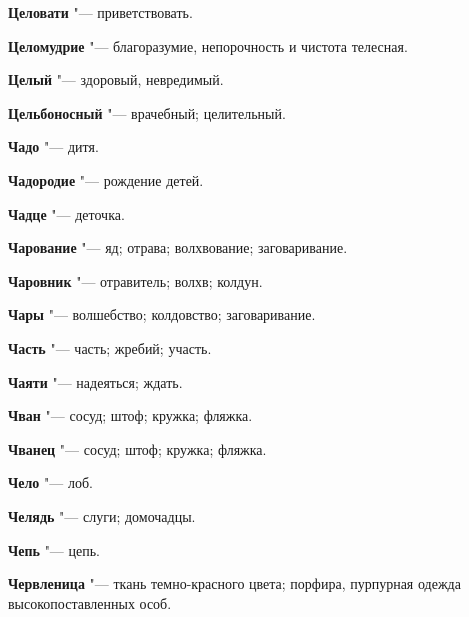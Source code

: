 \begin{mymulticols}{2}
\noindent\textbf{Целовати} "--- приветствовать. 




\noindent\textbf{Целомудрие} "--- благоразумие, непорочность и чистота телесная. 




\noindent\textbf{Целый} "--- здоровый, невредимый. 




\noindent\textbf{Цельбоносный} "--- врачебный; целительный. 









\noindent\textbf{Чадо} "--- дитя. 




\noindent\textbf{Чадородие} "--- рождение детей. 




\noindent\textbf{Чадце} "--- деточка. 




\noindent\textbf{Чарование} "--- яд; отрава; волхвование; заговаривание. 




\noindent\textbf{Чаровник} "--- отравитель; волхв; колдун. 




\noindent\textbf{Чары} "--- волшебство; колдовство; заговаривание. 




\noindent\textbf{Часть} "--- часть; жребий; участь. 




\noindent\textbf{Чаяти} "--- надеяться; ждать. 




\noindent\textbf{Чван} "--- сосуд; штоф; кружка; фляжка. 




\noindent\textbf{Чванец} "--- сосуд; штоф; кружка; фляжка. 




\noindent\textbf{Чело} "--- лоб. 




\noindent\textbf{Челядь} "--- слуги; домочадцы. 




\noindent\textbf{Чепь} "--- цепь. 




\noindent\textbf{Червленица} "--- ткань темно-красного цвета; порфира, пурпурная одежда высокопоставленных особ. 





\end{mymulticols}
